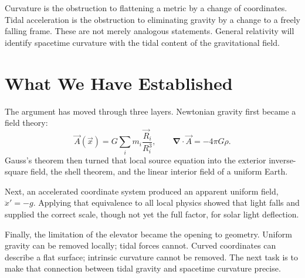 Curvature is the obstruction to flattening a metric by a change of
coordinates. Tidal acceleration is the obstruction to eliminating gravity
by a change to a freely falling frame. These are not merely analogous
statements. General relativity will identify spacetime curvature with the
tidal content of the gravitational field.

\section{What We Have Established}

The argument has moved through three layers. Newtonian gravity first became
a field theory:
\begin{equation}
  \vec A(\vec x)
  =
  G\sum_i m_i\frac{\vec R_i}{R_i^3},
  \qquad
  \boldsymbol{\nabla}\cdot\vec A=-4\pi G\rho.
\end{equation}
Gauss's theorem then turned that local source equation into the exterior
inverse-square field, the shell theorem, and the linear interior field of a
uniform Earth.

Next, an accelerated coordinate system produced an apparent uniform field,
\(\ddot x'=-g\). Applying that equivalence to all local physics showed that
light falls and supplied the correct scale, though not yet the full factor,
for solar light deflection.

Finally, the limitation of the elevator became the opening to geometry.
Uniform gravity can be removed locally; tidal forces cannot. Curved
coordinates can describe a flat surface; intrinsic curvature cannot be
removed. The next task is to make that connection between tidal gravity and
spacetime curvature precise.
